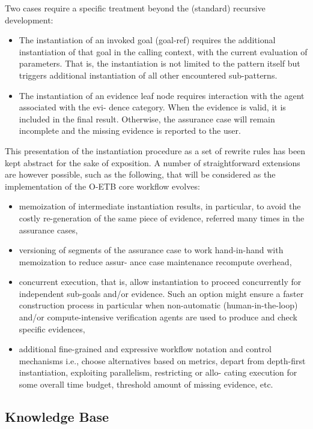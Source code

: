 \documentclass[12pt,twoside,a4paper]{article}
\begin{document}
Two cases require a specific treatment beyond the (standard) recursive development:

\begin{itemize}
\item
  The instantiation of an invoked goal (goal-ref) requires the additional instantiation of that goal in the calling context, with the current evaluation of parameters. That is, the instantiation is not limited to the pattern itself but triggers additional instantiation of all other encountered sub-patterns.
\item
  The instantiation of an evidence leaf node requires interaction with the agent associated with the evi- dence category. When the evidence is valid, it is included in the final result. Otherwise, the assurance case will remain incomplete and the missing evidence is reported to the user.
\end{itemize}

This presentation of the instantiation procedure as a set of rewrite rules has been kept abstract for the sake of exposition. A number of straightforward extensions are however possible, such as the following, that will be considered as the implementation of the O-ETB core workflow evolves:

\begin{itemize}
\item
  memoization of intermediate instantiation results, in particular, to avoid the costly re-generation of the same piece of evidence, referred many times in the assurance cases,
\item
  versioning of segments of the assurance case to work hand-in-hand with memoization to reduce assur- ance case maintenance recompute overhead,
\item
  concurrent execution, that is, allow instantiation to proceed concurrently for independent sub-goals and/or evidence. Such an option might ensure a faster construction process in particular when non-automatic (human-in-the-loop) and/or compute-intensive verification agents are used to produce and check specific evidences,
\item
  additional fine-grained and expressive workflow notation and control mechanisms i.e., choose alternatives based on metrics, depart from depth-first instantiation, exploiting parallelism, restricting or allo- cating execution for some overall time budget, threshold amount of missing evidence, etc.
\end{itemize}

\hypertarget{knowledge-base-2}{%
\subsection{Knowledge Base}\label{knowledge-base-2}}
\end{document}
